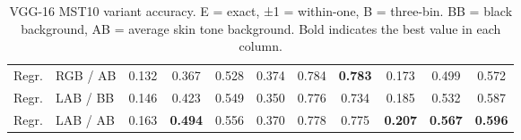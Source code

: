 \begin{table}[H]
\begin{tabular}{llccccccccc}
		Regr.         & RGB / AB            & 0.132                             & 0.367                             & 0.528                              & 0.374          & 0.784          & \textbf{0.783} & 0.173          & 0.499          & 0.572          \\
		Regr.         & LAB / BB            & 0.146                             & 0.423                             & 0.549                              & 0.350          & 0.776          & 0.734          & 0.185          & 0.532          & 0.587          \\
		Regr.         & LAB / AB            & 0.163                             & \textbf{0.494}                    & 0.556                              & 0.370          & 0.778          & 0.775          & \textbf{0.207} & \textbf{0.567} & \textbf{0.596} \\
		\bottomrule
	\end{tabular}
	\caption{VGG-16 MST10 variant accuracy. E = exact, ±1 = within-one, B = three-bin.
		BB = black background, AB = average skin tone background. Bold indicates the best
		value in each column.}
	\label{tab:vgg16_mst10}
\end{table}


